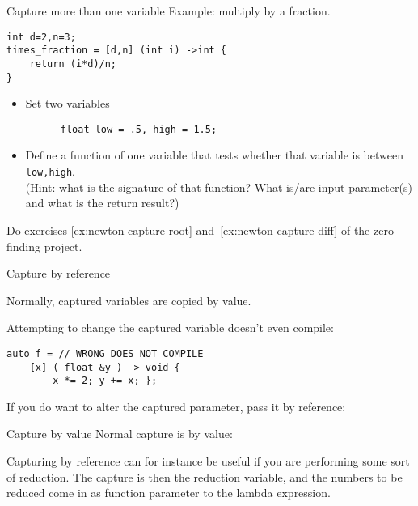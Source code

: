 \begin{block}{Capture more than one variable}
  \label{sl:capture-fraction}
  Example: multiply by a fraction.
\begin{lstlisting}
int d=2,n=3;
times_fraction = [d,n] (int i) ->int {
    return (i*d)/n;
}
\end{lstlisting}
\end{block}

\begin{exercise}
  \label{ex:capture-between}
  \begin{itemize}
  \item Set two variables 
    \begin{lstlisting}
      float low = .5, high = 1.5;
    \end{lstlisting}
  \item Define a function of one variable that tests
    whether that variable is between \lstinline{low,high}.\\
    (Hint: what is the signature of that function?
    What is/are input parameter(s) and what is the return result?)
  \end{itemize}
\end{exercise}

\begin{exercise}
  Do exercises \ref{ex:newton-capture-root} and~\ref{ex:newton-capture-diff}
  of the zero-finding project.
\end{exercise}

 {Capture by reference}

Normally, captured variables are copied by value.

Attempting to change the captured variable doesn't even compile:
\begin{lstlisting}
auto f = // WRONG DOES NOT COMPILE
    [x] ( float &y ) -> void {
        x *= 2; y += x; };
\end{lstlisting}

If you do want to alter the captured parameter,
pass it by reference:

\begin{slide}{Capture by value}
  \label{sl:lambda-val-val}
Normal capture is by value:
\end{slide}

Capturing by reference can for instance be useful
if you are performing some sort of reduction.
The capture is then the reduction variable,
and the numbers to be reduced come in as function parameter
to the lambda expression.

